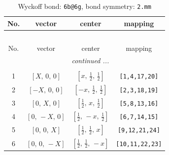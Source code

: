 \documentclass[fleqn,8pt]{jsarticle}
\begin{document}
\renewcommand{\arraystretch}{1.2}
\begin{longtable}{cccc}
\caption{Wyckoff bond: {\tt 6b@6g}, bond symmetry: {\tt 2.mm}}
 \\
 \hline \hline
No. & vector & center & mapping \\ \hline \endfirsthead

\multicolumn{3}{l}{\tablename\ \thetable{}} \\
 \hline \hline
No. & vector & center & mapping \\ \hline \endhead

 \hline \hline
\multicolumn{3}{r}{\footnotesize\it continued ...} \\ \endfoot

 \hline \hline
\multicolumn{3}{r}{} \\ \endlastfoot

1 & $\left[ X,\, 0,\, 0 \right]$ & $\left[ x,\, \frac{1}{2},\, \frac{1}{2} \right]$ & {\tt [1,4,17,20]} \\ \hline
2 & $\left[ - X,\, 0,\, 0 \right]$ & $\left[ - x,\, \frac{1}{2},\, \frac{1}{2} \right]$ & {\tt [2,3,18,19]} \\ \hline
3 & $\left[ 0,\, X,\, 0 \right]$ & $\left[ \frac{1}{2},\, x,\, \frac{1}{2} \right]$ & {\tt [5,8,13,16]} \\ \hline
4 & $\left[ 0,\, - X,\, 0 \right]$ & $\left[ \frac{1}{2},\, - x,\, \frac{1}{2} \right]$ & {\tt [6,7,14,15]} \\ \hline
5 & $\left[ 0,\, 0,\, X \right]$ & $\left[ \frac{1}{2},\, \frac{1}{2},\, x \right]$ & {\tt [9,12,21,24]} \\ \hline
6 & $\left[ 0,\, 0,\, - X \right]$ & $\left[ \frac{1}{2},\, \frac{1}{2},\, - x \right]$ & {\tt [10,11,22,23]} \\
\end{longtable}
\renewcommand{\arraystretch}{1.2}
\end{document}
